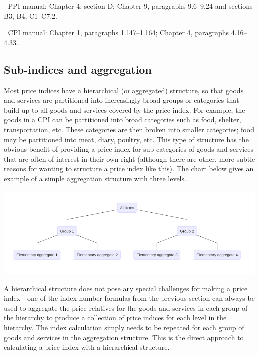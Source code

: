 \documentclass[]{article}
\begin{document}
📖 PPI manual: Chapter 4, section D; Chapter 9, paragraphs 9.6--9.24 and sections B3, B4, C1--C7.2.

📖 CPI manual: Chapter 1, paragraphs 1.147--1.164; Chapter 4, paragraphs 4.16--4.33.

\hypertarget{sub-indices-and-aggregation}{%
\subsection{Sub-indices and aggregation}\label{sub-indices-and-aggregation}}

Most price indices have a hierarchical (or aggregated) structure, so that goods and services are partitioned into increasingly broad groups or categories that build up to all goods and services covered by the price index. For example, the goods in a CPI can be partitioned into broad categories such as food, shelter, transportation, etc. These categories are then broken into smaller categories; food may be partitioned into meat, diary, poultry, etc. This type of structure has the obvious benefit of providing a price index for sub-categories of goods and services that are often of interest in their own right (although there are other, more subtle reasons for wanting to structure a price index like this). The chart below gives an example of a simple aggregation structure with three levels.

\includegraphics{img/plot1.png}

A hierarchical structure does not pose any special challenges for making a price index---one of the index-number formulas from the previous section can always be used to aggregate the price relatives for the goods and services in each group of the hierarchy to produce a collection of price indices for each level in the hierarchy. The index calculation simply needs to be repeated for each group of goods and services in the aggregation structure. This is the direct approach to calculating a price index with a hierarchical structure.
\end{document}
